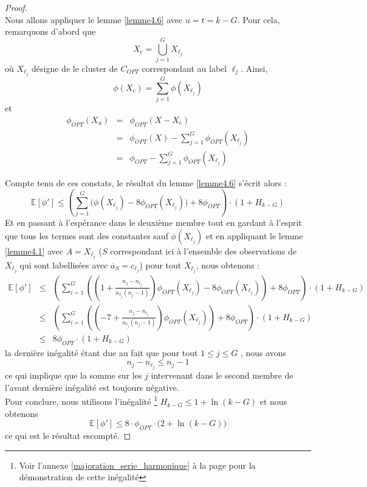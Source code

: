\documentclass[12pt,a4paper]{book}
\newcommand{\E}{\mathbb{E}}
\newcommand{\1}{\mathds{1}}
\begin{document}
	\begin{proof}
		~\\
		Nous allons appliquer le lemme \ref{lemme4.6} avec $u=t=k-G$. Pour cela, remarquons d'abord que 
		$$
			X_c = \bigcup_{j=1}^G X_{\ell_j}
		$$
		où $X_{\ell_j}$ désigne de le cluster de $C_{OPT}$ correspondant au label $\ell_j$. Ainsi,
		$$
			\phi(X_c) = \sum_{j=1}^G \phi\left(X_{\ell_j}\right)
		$$
		et 
		\begin{eqnarray*}
			\phi_{OPT}(X_u) &=& \phi_{OPT} (X-X_c) \\
			&=& \phi_{OPT}(X) - \sum_{j=1}^G \phi_{OPT} \left( X_{\ell_j} \right) \\
			&=& \phi_{OPT} - \sum_{j=1}^G \phi_{OPT} \left( X_{\ell_j} \right)
		\end{eqnarray*}
		
		Compte tenu de ces constats, le résultat du lemme \ref{lemme4.6} s'écrit alors :
		$$
			\E[\phi'] \leq \left( \sum_{j=1}^G \bigg( \phi(X_{\ell_j}) - 8 \phi_{OPT}(X_{\ell_j}) \bigg) + 8 \phi_{OPT} \right) \cdot \left(1 + H_{k-G} \right)
		$$
		Et en passant à l'espérance dans le deuxième membre tout en gardant à l'esprit que tous les termes sont des constantes sauf $\phi(X_{\ell_j})$ et en appliquant le lemme \ref{lemme4.1} avec $A=X_{\ell_j}$ ($S$ correspondant ici à l'ensemble des observations de $X_{\ell_j}$ qui sont labellisées avec $\overline{a}_S=c_{\ell_j}$) pour tout $X_{\ell_j}$, nous obtenons :
		\begin{eqnarray*}
			\E[\phi'] & \leq & \left( \sum_{i=1}^G \left( \left( 1 + \frac{n_j -n_{\ell_j}}{n_{\ell_j}(n_j - 1)} \right) \phi_{OPT}(X_{\ell_j}) - 8 \phi_{OPT}(X_{\ell_j}) \right) + 8 \phi_{OPT} \right) \cdot \left(1 + H_{k-G} \right) \\
			& \leq & \left( \sum_{i=1}^G \left( \left( -7 + \frac{n_j -n_{\ell_j}}{n_{\ell_j}(n_j - 1)} \right) \phi_{OPT}(X_{\ell_j}) \right) + 8 \phi_{OPT} \right) \cdot \left(1 + H_{k-G} \right) \\
			& \leq & 8 \phi_{OPT} \cdot \left(1 + H_{k-G} \right) 
		\end{eqnarray*}
		la dernière inégalité étant due au fait que pour tout $1 \leq j \leq G$ , nous avons 
		$$
			n_j - n_{\ell_j} \leq n_j - 1
		$$ 
		ce qui implique que la somme sur les $j$ intervenant dans le second membre de l'avant dernière inégalité est toujours négative.\\
		Pour conclure, nous utilisons l'inégalité \footnote{Voir l'annexe \ref{majoration_serie_harmonique} à la page \pageref{majoration_serie_harmonique} pour la démonstration de cette inégalité} $H_{k-G} \leq 1 + \ln (k-G)$ et nous obtenons 
		$$
			\E [\phi'] \leq 8 \cdot \phi_{OPT} \cdot \bigg(2 + \ln (k-G)\bigg)
		$$
		ce qui est le résultat escompté.
	\end{proof}
	
\end{document}
